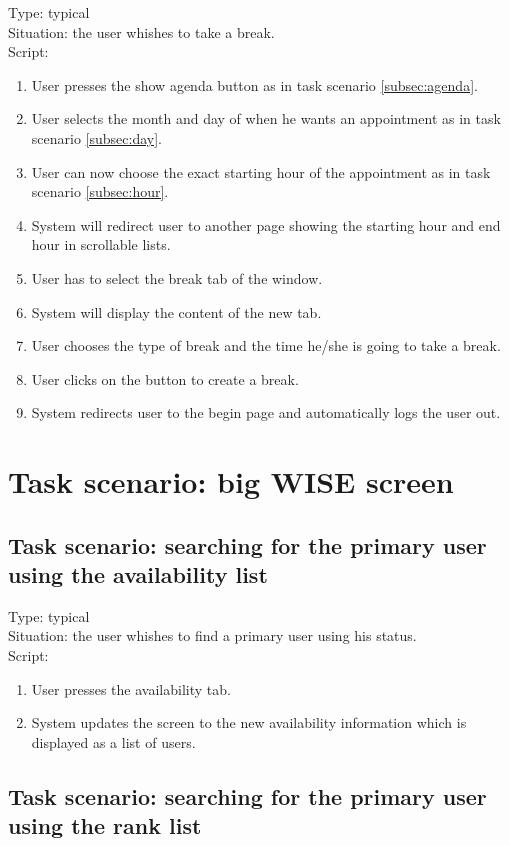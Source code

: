 \documentclass[11pt, a4paper,svglistings]{report}
\begin{document}
Type: typical \\
Situation: the user whishes to take a break. \\
Script:
\begin{enumerate}
\item User presses the show agenda button as in task scenario \ref{subsec:agenda}.
\item User selects the month and day of when he wants an appointment as in task scenario \ref{subsec:day}.
\item User can now choose the exact starting hour of the appointment as in task scenario \ref{subsec:hour}.
\item System will redirect user to another page showing the starting hour and end hour in scrollable lists.
\item User has to select the break tab of the window.
\item System will display the content of the new tab.
\item User chooses the type of break and the time he/she is going to take a break.
\item User clicks on the button to create a break.
\item System redirects user to the begin page and automatically logs the user out.
\end{enumerate}


\section{Task scenario: big WISE screen}


\subsection{Task scenario: searching for the primary user using the availability list}


\label{subsec:availability}Type: typical \\
Situation: the user whishes to find a primary user using his status. \\
Script:
\begin{enumerate}
\item User presses the availability tab.
\item System updates the screen to the new availability information which is displayed as a list of users.
\end{enumerate}



\subsection{Task scenario: searching for the primary user using the rank list}
\end{document}

